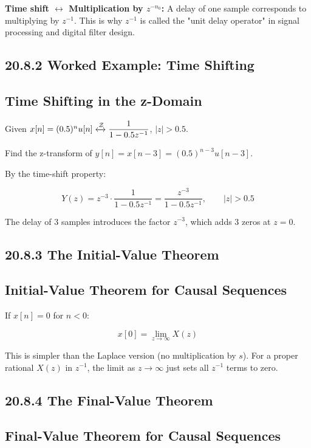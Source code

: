 \documentclass[11pt]{article}
\begin{document}
\textbf{Time shift $\leftrightarrow$ Multiplication by $z^{-n_0}$:} A delay of one sample corresponds to multiplying by $z^{-1}$. This is why $z^{-1}$ is called the "unit delay operator" in signal processing and digital filter design.

\subsection*{20.8.2 Worked Example: Time Shifting}

\subsection*{Time Shifting in the z-Domain}

Given $x[n] = (0.5)^n u[n] \xleftrightarrow{\mathcal{Z}} \dfrac{1}{1 - 0.5 z^{-1}}$, $|z| > 0.5$.

Find the z-transform of $y[n] = x[n - 3] = (0.5)^{n-3} u[n - 3]$.

By the time-shift property:

\[Y(z) = z^{-3} \cdot \frac{1}{1 - 0.5 z^{-1}} = \frac{z^{-3}}{1 - 0.5 z^{-1}}, \qquad |z| > 0.5\]

The delay of 3 samples introduces the factor $z^{-3}$, which adds 3 zeros at $z = 0$.

\subsection*{20.8.3 The Initial-Value Theorem}

\subsection*{Initial-Value Theorem for Causal Sequences}

If $x[n] = 0$ for $n < 0$:

\[x[0] = \lim_{z \to \infty} X(z)\]

This is simpler than the Laplace version (no multiplication by $s$). For a proper rational $X(z)$ in $z^{-1}$, the limit as $z \to \infty$ just sets all $z^{-1}$ terms to zero.

\subsection*{20.8.4 The Final-Value Theorem}

\subsection*{Final-Value Theorem for Causal Sequences}
\end{document}
